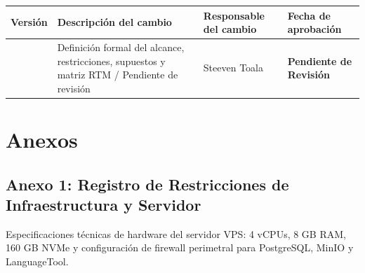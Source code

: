 \documentclass[12pt,a4paper]{article}
\begin{document}
\noindent
\renewcommand{\arraystretch}{1.2}
\begin{tabularx}{\textwidth}{|>{\hsize=0.45\hsize\centering\arraybackslash}X|>{\hsize=1.55\hsize\raggedright\arraybackslash}X|>{\hsize=1.2\hsize\raggedright\arraybackslash}X|>{\hsize=0.8\hsize\centering\arraybackslash}X|}
    \hline
    \rowcolor{gray!20}
    \textbf{Versión} & \textbf{Descripción del cambio} & \textbf{Responsable del cambio} & \textbf{Fecha de aprobación} \\
    \hline
    1.0 & Definición formal del alcance, restricciones, supuestos y matriz RTM / Pendiente de revisión & Steeven Toala & \textbf{\textcolor{gray!90}{Pendiente de Revisión}} \\
    \hline
\end{tabularx}

\vspace{0.4cm}

\section{Anexos}
\subsection*{Anexo 1: Registro de Restricciones de Infraestructura y Servidor}
Especificaciones técnicas de hardware del servidor VPS: 4 vCPUs, 8 GB RAM, 160 GB NVMe y configuración de firewall perimetral para PostgreSQL, MinIO y LanguageTool.
\end{document}
